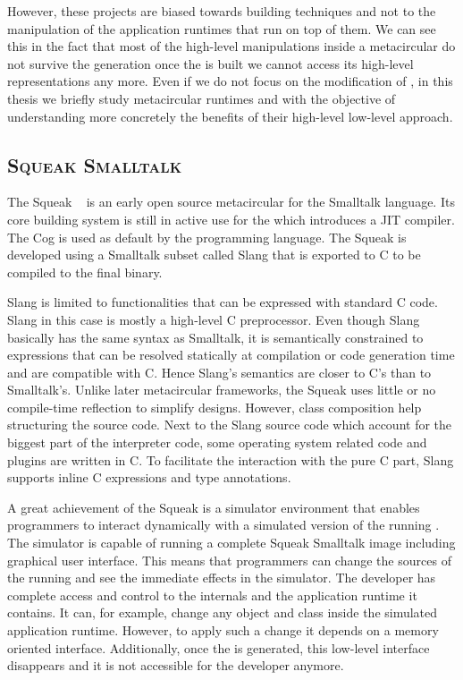 However, these projects are biased towards \VM building techniques and not to the manipulation of the application runtimes that run on top of them. We can see this in the fact that most of the high-level manipulations inside a metacircular \VMs do not survive the \VM generation \ie once the \VM is built we cannot access its high-level representations any more.  Even if we do not focus on the modification of \VMs, in this thesis we briefly study metacircular runtimes and \VMs with the objective of understanding more concretely the benefits of their high-level low-level approach.

\subsection*{\textsc{Squeak Smalltalk \VM}}
The Squeak \VM~\cite{Inga97a} is an early open source metacircular \VM for the Smalltalk language. 
Its core building system is still in active use for the  which introduces a JIT compiler.
The Cog \VM is used as default by the  programming language.
The Squeak \VM is developed using a Smalltalk subset called Slang that is exported to C to be compiled to the final \VM binary.

Slang is limited to functionalities that can be expressed with standard C code.
Slang in this case is mostly a high-level C preprocessor.
Even though Slang basically has the same syntax as Smalltalk, it is semantically constrained to expressions that can be resolved statically at compilation or code generation time and are compatible with C.
Hence Slang's semantics are closer to C's than to Smalltalk's.
Unlike later metacircular frameworks, the Squeak \VM uses little or no compile-time reflection to simplify \VM designs.
However, class composition help structuring the source code.
Next to the Slang source code which account for the biggest part of the interpreter code, some operating system related code and plugins are written in C.
To facilitate the interaction with the pure C part, Slang supports inline C expressions and type annotations.

A great achievement of the Squeak \VM is a simulator environment that enables programmers to interact dynamically with a simulated version of the running \VM.
The simulator is capable of running a complete Squeak Smalltalk image including graphical user interface.
This means that programmers can change the sources of the running \VM and see the immediate effects in the simulator.
The \VM developer has complete access and control to the \VM internals and the application runtime it contains. It can, for example, change any object and class inside the simulated application runtime. However, to apply such a change it depends on a memory oriented interface. Additionally, once the \VM is generated, this low-level interface disappears and it is not accessible for the developer anymore.

